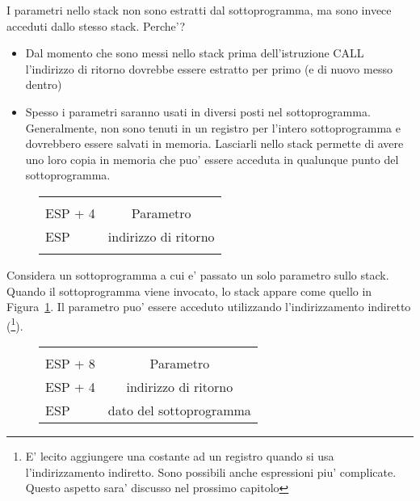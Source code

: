 I parametri nello stack non sono estratti dal sottoprogramma, ma sono invece
acceduti dallo stesso stack. Perche'?
\begin{itemize}
\item Dal momento che sono messi nello stack prima dell'istruzione {\code CALL}
l'indirizzo di ritorno dovrebbe essere estratto per primo (e di nuovo 
messo dentro)
\item Spesso i parametri saranno usati in diversi posti nel sottoprogramma.
Generalmente, non sono tenuti in un registro per l'intero sottoprogramma
e dovrebbero essere salvati in memoria. Lasciarli nello stack permette di
avere uno loro copia in memoria che puo' essere acceduta in qualunque
punto del sottoprogramma.
\end{itemize}

\begin{figure}
\centering
\begin{tabular}{l|c|}
\cline{2-2}
&  \\ \cline{2-2}
ESP + 4 & Parametro \\ \cline{2-2}
ESP     & indirizzo di ritorno \\ \cline{2-2}
 & \\ \cline{2-2}
\end{tabular}
\caption{}
\label{fig:stack1}
\end{figure}
Considera 
un sottoprogramma a cui e' passato un solo parametro sullo stack. Quando
il sottoprogramma viene invocato, lo stack appare come quello in 
Figura~\ref{fig:stack1}. Il parametro puo' essere acceduto utilizzando
l'indirizzamento indiretto ({\code [ESP+4]}\footnote{E' lecito aggiungere
una costante ad un registro quando si usa l'indirizzamento indiretto. Sono
possibili anche espressioni piu' complicate. Questo aspetto sara' 
discusso nel prossimo capitolo}).
\begin{figure}
\centering
\begin{tabular}{l|c|}
\cline{2-2}
&  \\ \cline{2-2}
ESP + 8 & Parametro \\ \cline{2-2}
ESP + 4 & indirizzo di ritorno \\ \cline{2-2}
ESP     & dato del sottoprogramma \\ \cline{2-2}
\end{tabular}
\caption{}
\label{fig:stack2}
\end{figure}

